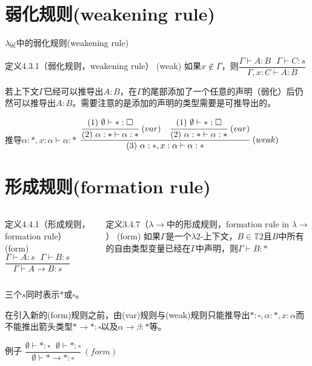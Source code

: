 \documentclass[UTF8,aspectratio=169,mathserif]{beamer}
\begin{document}
	\section{弱化规则(weakening rule)}
		\begin{frame}{$\lambda{\uline{\omega}}$中的弱化规则(weakening rule)}
			\begin{exampleblock}{定义4.3.1（弱化规则，weakening rule）}
				(weak) 如果$x\not\in\Gamma$，则$\dfrac{\Gamma\vdash A:B\ \ \ \Gamma\vdash C:s}{\Gamma,x:C\vdash A:B}$
			\end{exampleblock}
		
			若上下文$\Gamma$已经可以推导出$A:B$，在$\Gamma$的尾部添加了一个任意的声明（弱化）后仍然可以推导出$A:B$。需要注意的是添加的声明的类型需要是可推导出的。
		
			\begin{block}{推导$\alpha:*,x:\alpha\vdash\alpha:*$}
				$\cfrac{\cfrac{(1)\ \emptyset\vdash*:\square}{(2)\ \alpha:*\vdash\alpha:*}\ (var)\ \ \ \cfrac{(1)\ \emptyset\vdash*:\square}{(2)\ \alpha:*\vdash\alpha:*}\ (var)}{(3)\ \alpha:*,x:\alpha\vdash\alpha:*}\ (weak)$
			\end{block}
		
		\end{frame}

	\section{形成规则(formation rule)}
		\begin{frame}
			\begin{columns}
				\begin{column}{0.48\textwidth}
					\begin{exampleblock}{定义4.4.1（形成规则，formation rule）}
						(form)\ $\dfrac{\Gamma\vdash A:s\ \ \ \Gamma\vdash B:s}{\Gamma\vdash A\rightarrow B:s}$
					\end{exampleblock}
				\end{column}
				\begin{column}{0.48\textwidth}
					\begin{block}{定义3.4.7（$\lambda{\rightarrow}$中的形成规则，formation rule in $\lambda{\rightarrow}$）}
						(form) 如果$\Gamma$是一个$\lambda{2}$-上下文，$B\in\mathbb{T}2$且$B$中所有的自由类型变量已经在$\Gamma$中声明，则$\Gamma\vdash B:*$
					\end{block}
				\end{column}
			\end{columns}
			
			三个$s$同时表示*或$\square$。
			
			在引入新的(form)规则之前，由(var)规则与(weak)规则只能推导出$*:\square,\alpha:*,x:\alpha$而不能推出箭头类型$*\rightarrow*:\square$以及$\alpha\rightarrow\beta:*$等。
			
			\begin{block}{例子}
				$\dfrac{\emptyset\vdash*:\square\ \ \ \emptyset\vdash*:\square}{\emptyset\vdash*\rightarrow*:\square}\ (form)$
			\end{block}
			
		\end{frame}
\end{document}
